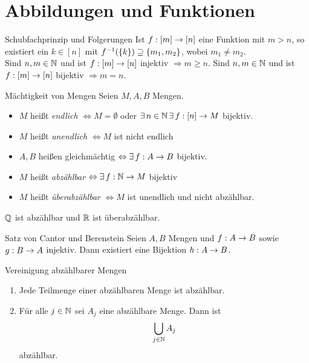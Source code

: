 \documentclass[main.tex]{subfiles}
\begin{document}
\section*{Abbildungen und Funktionen}
\begin{karte}{Schubfachprinzip und Folgerungen}
    Ist \( f : [m] \rightarrow [n] \) eine Funktion mit 
    \( m > n \), so existiert ein \( k \in [n] \) mit 
    \( f^{-1}(\{k\}) \supseteq \{m_1, m_2\}  \), 
    wobei \( m_1 \neq m_2 \).\\
    Sind \( n,m \in \mathbb{N} \) und ist \( f : [m] \rightarrow [n] \) injektiv 
    \( \Rightarrow m \geq n \).
    Sind \( n,m \in \mathbb{N} \) und ist \( f : [m] \rightarrow [n] \) bijektiv 
    \( \Rightarrow m = n \).
\end{karte}
\begin{karte}{Mächtigkeit von Mengen}
    Seien \( M, A, B \) Mengen.
    \begin{itemize}
        \item \( M \) heißt \textit{endlich} \( \Leftrightarrow 
        M = \emptyset \) oder \( \exists n \in \N \, \exists 
        \abb{f}{[n]}{M} \) bijektiv.
        \item \( M \) heißt \textit{unendlich} 
        \(\Leftrightarrow M \) ist nicht endlich 
        \item \( A, B \) heißen gleichmächtig \( \Leftrightarrow 
        \exists \abb{f}{A}{B} \) bijektiv.
        \item \(M\) heißt \textit{abzählbar} 
        \( \Leftrightarrow \exists \abb{f}{\N}{M} \) bijektiv
        \item \( M \) heißt \textit{überabzählbar} \( \Leftrightarrow 
        M \) ist unendlich und nicht abzählbar.
    \end{itemize}
    \( \mathbb{Q} \) ist abzählbar und \( \mathbb{R} \) ist überabzählbar.
\end{karte}
\begin{karte}{Satz von Cantor und Berenstein}
    Seien \(A, B \) Mengen und \( f : A \rightarrow B \) 
    sowie \( g : B \rightarrow A \) injektiv.
	Dann existiert eine Bijektion \( h : A \rightarrow B \).
\end{karte}
\begin{karte}{Vereinigung abzählbarer Mengen}
    \begin{enumerate}
		\item Jede Teilmenge einer abzählbaren Menge ist abzählbar.
        \item Für alle \(j \in \mathbb{N} \) sei \(A_j \) 
        eine abzählbare Menge. Dann ist 
        \[ \bigcup_{j \in \mathbb{N}}{A_j} \] abzählbar.
	\end{enumerate}
\end{karte}
\end{document}
